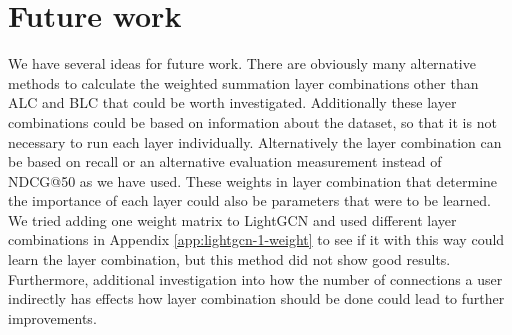 \section{Future work}
We have several ideas for future work.
There are obviously many alternative methods to calculate the weighted summation layer combinations other than ALC and BLC that could be worth investigated.
Additionally these layer combinations could be based on information about the dataset, so that it is not necessary to run each layer individually.
Alternatively the layer combination can be based on recall or an alternative evaluation measurement instead of NDCG@50 as we have used.
These weights in layer combination that determine the importance of each layer could also be parameters that were to be learned.
We tried adding one weight matrix to LightGCN and used different layer combinations in Appendix \ref{app:lightgcn-1-weight} to see if it with this way could learn the layer combination, but this method did not show good results.
Furthermore, additional investigation into how the number of connections a user indirectly has effects how layer combination should be done could lead to further improvements.




